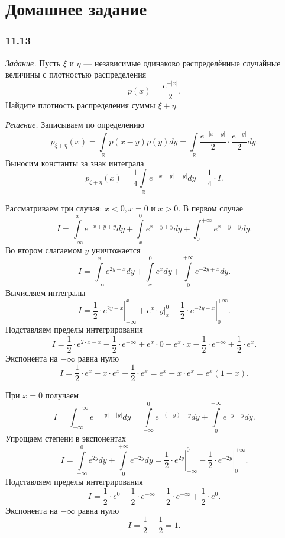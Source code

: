 \section*{Домашнее задание}

\subsubsection*{11.13}

\textit{Задание.} Пусть $ \xi $ и $ \eta $ --- независимые одинаково распределённые случайные величины с плотностью распределения
$$p \left( x \right) =
\frac{e^{- \left| x \right| }}{2}.$$
Найдите плотность распределения суммы $ \xi + \eta $.

\textit{Решение.} Записываем по определению
$$p_{ \xi + \eta } \left( x \right) =
\int \limits_{ \mathbb{R}} p \left( x-y \right) p \left( y \right) dy =
\int \limits_{ \mathbb{R}} \frac{e^{- \left| x-y \right| }}{2} \cdot \frac{e^{- \left| y \right| }}{2} dy.$$
Выносим константы за знак интеграла
$$p_{ \xi + \eta } \left( x \right) =
\frac{1}{4} \int \limits_{ \mathbb{R}} e^{- \left| x-y \right| - \left| y \right| } dy =
\frac{1}{4} \cdot I.$$

Рассматриваем три случая: $x < 0, x = 0$ и $x > 0$.
В первом случае
$$I =
\int \limits_{- \infty }^x e^{-x+y+y} dy + \int \limits_x^0 e^{x-y+y} dy + \int_0^{+ \infty } e^{x-y-y} dy.$$
Во втором слагаемом $y$ уничтожается
$$I =
\int \limits_{- \infty }^x e^{2y-x} dy + \int \limits_x^0 e^x dy + \int \limits_0^{+ \infty } e^{-2y+x} dy.$$
Вычисляем интегралы
$$I =
\left. \frac{1}{2} \cdot e^{2y-x} \right|_{- \infty }^x + \left. e^x \cdot y \right|_x^0 - \left. \frac{1}{2} \cdot e^{-2y+x} \right|_0^{+ \infty }.$$
Подставляем пределы интегрирования
$$I =
\frac{1}{2} \cdot e^{2 \cdot x - x} - \frac{1}{2} \cdot e^{- \infty } + e^x \cdot 0 - e^x \cdot x - \frac{1}{2} \cdot e^{- \infty } + \frac{1}{2} \cdot e^x.$$
Экспонента на $- \infty $ равна нулю
$$I =
\frac{1}{2} \cdot e^x - x \cdot e^x + \frac{1}{2} \cdot e^x =
e^x - x \cdot e^x =
e^x \left( 1 - x \right).$$

При $x = 0$ получаем
$$I =
\int_{- \infty }^{+ \infty } e^{- \left| -y \right| - \left| y \right| } dy =
\int \limits_{- \infty }^0 e^{- \left( -y \right) + y} dy + \int \limits_0^{+ \infty } e^{-y-y} dy.$$
Упрощаем степени в экспонентах
$$I =
\int \limits_{- \infty }^0 e^{2y} dy + \int \limits_0^{+ \infty } e^{-2y} dy =
\left. \frac{1}{2} \cdot e^{2y} \right|_{- \infty }^0 - \left. \frac{1}{2} \cdot e^{-2y} \right|_0^{+ \infty }.$$
Подставляем пределы интегрирования
$$I =
\frac{1}{2} \cdot e^0 - \frac{1}{2} \cdot e^{- \infty } - \frac{1}{2} \cdot e^{- \infty } + \frac{1}{2} \cdot e^0.$$
Экспонента на $- \infty $ равна нулю
$$I =
\frac{1}{2} + \frac{1}{2} =
1.$$

